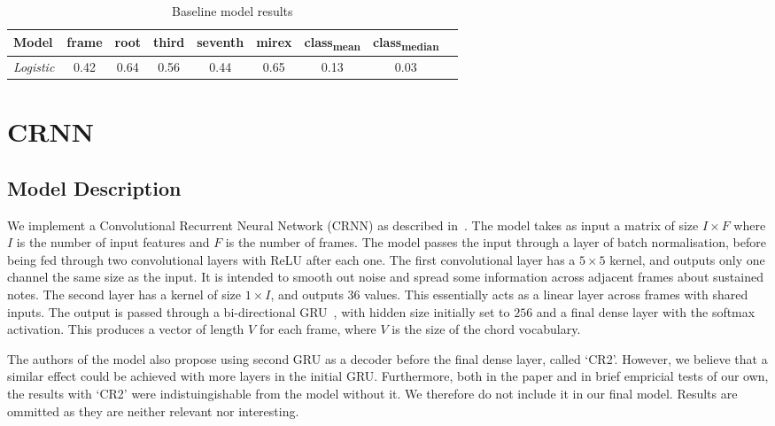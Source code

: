 \begin{table}[h]
    \centering
    \begin{tabular}{lcccccccc}
        \toprule
        Model & frame & root & third & seventh & mirex & class\textsubscript{mean} & class\textsubscript{median} \\  
        \midrule
        \emph{Logistic} & 0.42 & 0.64 & 0.56 & 0.44 & 0.65 & 0.13 & 0.03 \\
        \bottomrule
    \end{tabular}
    \caption{Baseline model results}
    \label{tab:baseline_results}
\end{table}

\section{CRNN}
\subsection{Model Description}

We implement a Convolutional Recurrent Neural Network (CRNN) as described in~\citet{StructuredTraining}. The model takes as input a matrix of size $I \times F$ where $I$ is the number of input features and $F$ is the number of frames. The model passes the input through a layer of batch normalisation, before being fed through two convolutional layers with ReLU after each one. The first convolutional layer has a $5\times 5$ kernel, and outputs only one channel the same size as the input. It is intended to smooth out noise and spread some information across adjacent frames about sustained notes. The second layer has a kernel of size $1\times I$, and outputs 36 values. This essentially acts as a linear layer across frames with shared inputs. The output is passed through a bi-directional GRU~\citep{GRU}, with hidden size initially set to $256$ and a final dense layer with the softmax activation. This produces a vector of length $V$ for each frame, where $V$ is the size of the chord vocabulary.

The authors of the model also propose using second GRU as a decoder before the final dense layer, called `CR2'. However, we believe that a similar effect could be achieved with more layers in the initial GRU. Furthermore, both in the paper and in brief empricial tests of our own, the results with `CR2' were indistuingishable from the model without it. We therefore do not include it in our final model. Results are ommitted as they are neither relevant nor interesting.

